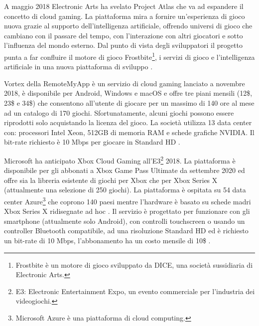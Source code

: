 A maggio 2018 Electronic Arts ha svelato Project Atlas che va ad espandere il concetto di cloud gaming. La piattaforma mira a fornire un'esperienza di gioco nuova grazie al supporto dell'intelligenza artificiale, offrendo universi di gioco che cambiano con il passare del tempo, con l'interazione con altri giocatori e sotto l'influenza del mondo esterno. Dal punto di vista degli sviluppatori il progetto punta a far confluire il motore di gioco Frostbite\footnote{Frostbite è un motore di gioco sviluppato da DICE, una società sussidiaria di Electronic Arts.}, i servizi di gioco e l'intelligenza artificiale in una nuova piattaforma di sviluppo \parencite{Project_Atlas}.

Vortex della RemoteMyApp è un servizio di cloud gaming lanciato a novembre 2018, è disponibile per Android, Windows e macOS e offre tre piani mensili (12\$, 23\$ e 34\$) che consentono all'utente di giocare per un massimo di 140 ore al mese ad un catalogo di 170 giochi. Sfortunatamente, alcuni giochi possono essere riprodotti solo acquistando la licenza del gioco. La società utilizza 13 data center con: processori Intel Xeon, 512GB di memoria RAM e schede grafiche NVIDIA. Il bit-rate richiesto è 10 Mbps per giocare in Standard HD \parencite{RemoteMyApp_Vortex}.

Microsoft ha anticipato Xbox Cloud Gaming all'E3\footnote{E3: Electronic Entertainment Expo, un evento commerciale per l'industria dei videogiochi.} 2018. La piattaforma è disponibile per gli abbonati a Xbox Game Pass Ultimate da settembre 2020 ed offre sia la libreria esistente di giochi per Xbox che per Xbox Series X (attualmente una selezione di 250 giochi). La piattaforma è ospitata su 54 data center Azure\footnote{Microsoft Azure è una piattaforma di cloud computing.} che coprono 140 paesi \parencite{xCloud_beta} mentre l'hardware è basato su schede madri Xbox Series X ridisegnate ad hoc \parencite{xCloudBlade}. Il servizio è progettato per funzionare con gli smartphone (attualmente solo Android), con controlli touchscreen o usando un controller Bluetooth compatibile, ad una risoluzione Standard HD ed è richiesto un bit-rate di 10 Mbps, l'abbonamento ha un costo mensile di 10\$ \parencite{Xbox_Game_Pass_cloud_gaming}.


